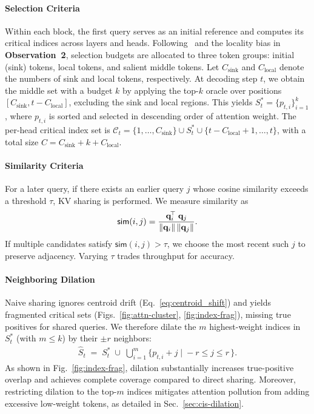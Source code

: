 \paragraph{Selection Criteria}
Within each block, the first query serves as an initial reference and computes its critical indices across layers and heads. Following~\cite{zhang2023h2o,wuhshare} and the locality bias in \textbf{Observation~2}, selection budgets are allocated to three token groups: initial (sink) tokens, local tokens, and salient middle tokens. Let $C_{\text{sink}}$ and $C_{\text{local}}$ denote the numbers of sink and local tokens, respectively. At decoding step $t$, we obtain the middle set with a budget $k$ by applying the top-$k$ oracle over positions $[C_{\text{sink}}, t\!-\!C_{\text{local}}]$, excluding the sink and local regions. This yields $S_t^*=\{p_{t,i}\}_{i=1}^{k}$, where $p_{t,i}$ is sorted and selected in descending order of attention weight. The per-head critical index set is $\mathcal{C}_t=\{1,\ldots,C_{\text{sink}}\} \cup S_t^* \cup \{t-C_{\text{local}}+1,\ldots,t\}$, with a total size $C=C_{\text{sink}}+k+C_{\text{local}}$.




\paragraph{Similarity Criteria}
For a later query, if there exists an earlier query $j$ whose cosine similarity exceeds a threshold $\tau$, KV sharing is performed. We measure similarity as
\begin{equation}
\begin{aligned}
\label{eq:cos_sim}
\mathsf{sim}(i,j)=\frac{\mathbf{q}_{i}^{\!\top} \; \mathbf{q}_{j}}{\|\mathbf{q}_{i}\|\,\|\mathbf{q}_{j}\|}.
\end{aligned}
\end{equation}
If multiple candidates satisfy $\mathsf{sim}(i,j)>\tau$, we choose the most recent such $j$ to preserve adjacency. Varying $\tau$ trades throughput for accuracy.

\paragraph{Neighboring Dilation}
Naive sharing ignores centroid drift (Eq.~\eqref{eq:centroid_shift}) and yields fragmented critical sets (Figs.~\ref{fig:attn-cluster}, \ref{fig:index-frag}), missing true positives for shared queries. We therefore dilate the $m$ highest-weight indices in $S_t^*$ (with $m\!\le\!k$) by their $\pm r$ neighbors:
\begin{equation}
\label{eq:neighboring}
\begin{aligned}
\hat S_t 
\;=\; 
S_t^* 
\;\cup\;
\bigcup_{i=1}^{m}\big\{p_{t,i}+j \;|\;-r\le j\le r\,\big\}.
\end{aligned}
\end{equation}
As shown in Fig.~\ref{fig:index-frag}, dilation substantially increases true-positive overlap and achieves complete coverage compared to direct sharing. Moreover, restricting dilation to the top-$m$ indices mitigates attention pollution from adding excessive low-weight tokens, as detailed in Sec.~\ref{sec:cis-dilation}.

